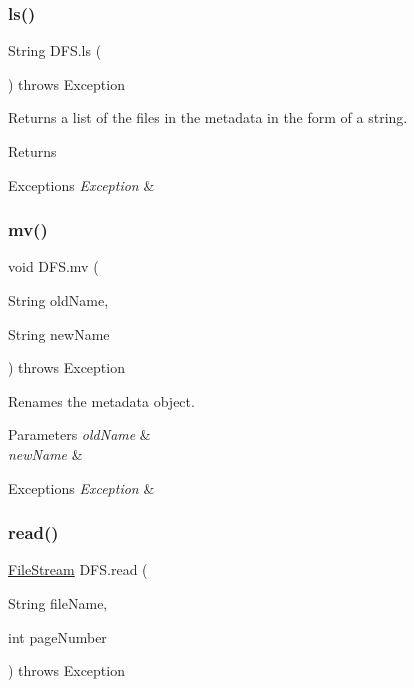 \subsubsection{\texorpdfstring{ls()}{ls()}}
{\footnotesize\ttfamily String D\+F\+S.\+ls (\begin{DoxyParamCaption}{ }\end{DoxyParamCaption}) throws Exception\hspace{0.3cm}{\ttfamily [inline]}}

Returns a list of the files in the metadata in the form of a string. \begin{DoxyReturn}{Returns}

\end{DoxyReturn}

\begin{DoxyExceptions}{Exceptions}
{\em Exception} & \\
\hline
\end{DoxyExceptions}
\mbox{\label{class_d_f_s_a7b0d44e11c6176a71d040919b6fe1d96}} 
\subsubsection{\texorpdfstring{mv()}{mv()}}
{\footnotesize\ttfamily void D\+F\+S.\+mv (\begin{DoxyParamCaption}\item[{String}]{old\+Name,  }\item[{String}]{new\+Name }\end{DoxyParamCaption}) throws Exception\hspace{0.3cm}{\ttfamily [inline]}}

Renames the metadata object. 
\begin{DoxyParams}{Parameters}
{\em old\+Name} & \\
\hline
{\em new\+Name} & \\
\hline
\end{DoxyParams}

\begin{DoxyExceptions}{Exceptions}
{\em Exception} & \\
\hline
\end{DoxyExceptions}
\mbox{\label{class_d_f_s_a2fe4f98b6e0dede1c97d67bbb5c77df1}} 
\subsubsection{\texorpdfstring{read()}{read()}}
{\footnotesize\ttfamily \mbox{\hyperlink{class_file_stream}{File\+Stream}} D\+F\+S.\+read (\begin{DoxyParamCaption}\item[{String}]{file\+Name,  }\item[{int}]{page\+Number }\end{DoxyParamCaption}) throws Exception\hspace{0.3cm}{\ttfamily [inline]}}

